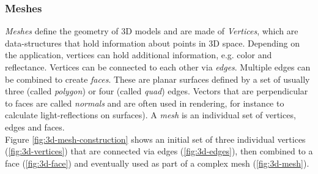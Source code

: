 \subsubsection{Meshes}
\emph{Meshes} define the geometry of 3D models and are made of \emph{Vertices}, which are data-structures that hold information about points in 3D space. Depending on the application, vertices can hold additional information, e.g. color and reflectance. Vertices can be connected to each other via \emph{edges}. Multiple edges can be combined to create \emph{faces}. These are planar surfaces defined by a set of usually three (called \emph{polygon}) or four (called \emph{quad}) edges. Vectors that are perpendicular to faces are called \emph{normals} and are often used in rendering, for instance to calculate light-reflections on surfaces). A \emph{mesh} is an individual set of vertices, edges and faces.\\
Figure \ref{fig:3d-mesh-construction} shows an initial set of three individual vertices (\ref{fig:3d-vertices}) that are connected via edges (\ref{fig:3d-edges}), then combined to a face (\ref{fig:3d-face}) and eventually used as part of a complex mesh (\ref{fig:3d-mesh}).

\newlength{\twosubht}
\newsavebox{\twosubbox}

